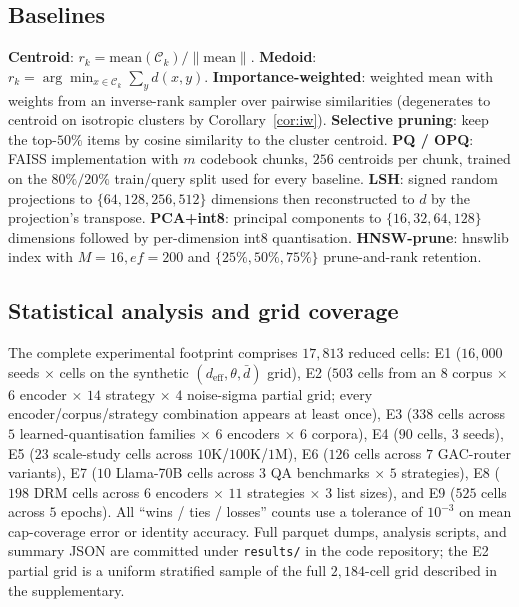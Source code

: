 \documentclass[11pt]{article}
\theoremstyle{definition}
\theoremstyle{remark}
\newcommand{\deff}{d_{\mathrm{eff}}}
\newcommand{\dbar}{\bar{d}}
\newcommand{\clusterset}{\mathcal{C}}
\begin{document}
\subsection*{Baselines}
\textbf{Centroid}: $r_k = \mathrm{mean}(\clusterset_k) / \|\mathrm{mean}\|$.
\textbf{Medoid}: $r_k = \arg\min_{x \in \clusterset_k} \sum_y d(x,y)$.
\textbf{Importance-weighted}: weighted mean with weights from an inverse-rank
sampler over pairwise similarities (degenerates to centroid on isotropic
clusters by Corollary~\ref{cor:iw}).
\textbf{Selective pruning}: keep the top-$50\%$ items by cosine similarity
to the cluster centroid.
\textbf{PQ / OPQ}\cite{jegouPQ2011,ge2013optimized}: FAISS implementation
with $m$ codebook chunks, $256$ centroids per chunk, trained on the
$80\%/20\%$ train/query split used for every baseline.
\textbf{LSH}\cite{charikarLSH2002}: signed random projections to
$\{64, 128, 256, 512\}$ dimensions then reconstructed to $d$ by
the projection's transpose.
\textbf{PCA+int8}: principal components to $\{16, 32, 64, 128\}$
dimensions followed by per-dimension int8 quantisation.
\textbf{HNSW-prune}\cite{malkovHNSW2018}: hnswlib index with
$M=16, ef=200$ and $\{25\%, 50\%, 75\%\}$ prune-and-rank retention.

\subsection*{Statistical analysis and grid coverage}
The complete experimental footprint comprises $17{,}813$
reduced cells: E1 ($16{,}000$ seeds $\times$ cells on the synthetic
$(\deff, \theta, \dbar)$ grid), E2 ($503$ cells from an $8$ corpus
$\times$ $6$ encoder $\times$ $14$ strategy $\times$ $4$ noise-sigma
partial grid; every encoder/corpus/strategy combination appears at
least once), E3 ($338$ cells across $5$ learned-quantisation families
$\times$ $6$ encoders $\times$ $6$ corpora), E4 ($90$ cells, $3$
seeds), E5 ($23$ scale-study cells across $10$K/$100$K/$1$M),
E6 ($126$ cells across $7$ GAC-router variants), E7 ($10$ Llama-70B
cells across $3$ QA benchmarks $\times$ $5$ strategies),
E8 ($198$ DRM cells across $6$ encoders $\times$ $11$ strategies
$\times$ $3$ list sizes), and E9 ($525$ cells across $5$ epochs).  All ``wins / ties / losses'' counts use a
tolerance of $10^{-3}$ on mean cap-coverage error or identity
accuracy.  Full parquet dumps, analysis scripts, and summary JSON are
committed under \texttt{results/} in the code repository; the E2
partial grid is a uniform stratified sample of the full $2{,}184$-cell
grid described in the supplementary.
\end{document}
